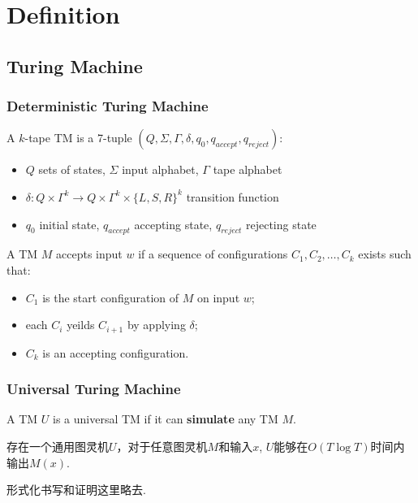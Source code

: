 \section{Definition}
\subsection{Turing Machine}
\begin{frame}
    \frametitle{Deterministic Turing Machine}
\begin{definition}
    A $k$-tape TM is a 7-tuple $(Q, \Sigma, \Gamma, \delta, q_0, q_{accept}, q_{reject})$:
    \begin{itemize}
        \item $Q$ sets of states, $\Sigma$ input alphabet, $\Gamma$ tape alphabet
        \item $\delta: Q\times \Gamma^k \rightarrow Q\times \Gamma^k\times \{L,S,R\}^k$ transition function
        \item $q_0$ initial state, $q_{accept}$ accepting state, $q_{reject}$ rejecting state
    \end{itemize}
\end{definition}
\pause
\begin{definition}[Computation of a TM]
    A TM $M$ accepts input $w$ if a sequence of configurations $C_1, C_2, \ldots, C_k$ exists such that:
    \begin{itemize}
        \item $C_1$ is the start configuration of $M$ on input $w$;
        \item each $C_i$ yeilds $C_{i+1}$ by applying $\delta$;
        \item $C_k$ is an accepting configuration.
    \end{itemize}
\end{definition}
\end{frame}

\begin{frame}
    \frametitle{Universal Turing Machine}
\begin{definition}
    A TM $U$ is a universal TM if it can \textbf{simulate} any TM $M$.
\end{definition}

\begin{theorem}
    存在一个通用图灵机$U$，对于任意图灵机$M$和输入$x$, $U$能够在$O(T\log T)$时间内输出$M(x)$.
\end{theorem}
形式化书写和证明这里略去.
\end{frame}

